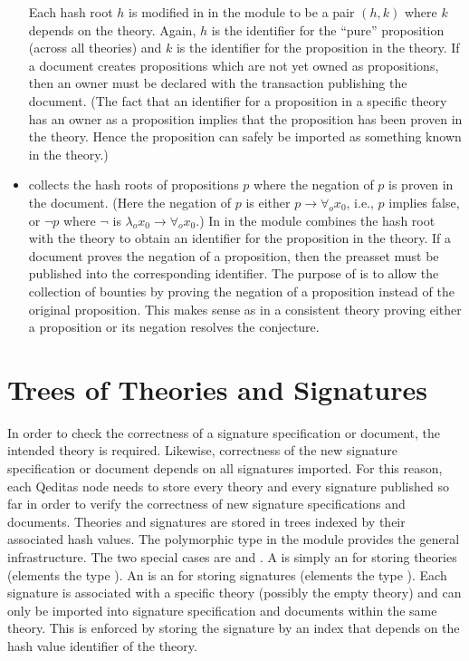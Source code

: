 \begin{itemize}
Each hash root $h$ is modified in {} in the module {}
to be a pair $(h,k)$ where $k$ depends on the theory.
Again, $h$ is the identifier for the ``pure'' proposition (across all theories)
and $k$ is the identifier for the proposition in the theory.
If a document creates propositions which are not yet owned as propositions, then an
owner must be declared with the transaction publishing the document.
(The fact that an identifier for a proposition in a specific theory has an owner as a proposition
implies that the proposition has been proven in the theory. Hence the proposition can safely
be imported as something known in the theory.)
\item {} collects the hash roots of propositions $p$
 where the negation of $p$ is proven in the document.
 (Here the negation of $p$ is either $p\to\forall_o x_0$, i.e., $p$ implies false,
 or $\neg p$ where $\neg$ is $\lambda_o x_0\to\forall_o x_0$.)
 In {} in the module {} combines the hash
 root with the theory to obtain an identifier for the proposition in the theory.
 If a document proves the negation of a proposition, then the {}
 preasset must be published into the corresponding identifier.
 The purpose of {} is to allow the collection of bounties by
 proving the negation of a proposition instead of the original proposition.
 This makes sense as in a consistent theory proving either a proposition or its negation
 resolves the conjecture.
\end{itemize}

\section{Trees of Theories and Signatures}

In order to check the correctness of a signature specification
or document, the intended theory is required.
Likewise, correctness of the new signature specification
or document depends on all signatures imported.
For this reason, each Qeditas node needs to store every theory
and every signature published so far in order to verify the correctness of
new signature specifications and documents.
Theories and signatures are stored in trees indexed by their associated
hash values. The polymorphic type {} in the module {}
provides the general infrastructure.
The two special cases are
{}
and
{}.
A {} is simply an {} for storing theories (elements the type {}).
An {} is an {} for storing signatures (elements the type {}).
Each signature is associated with a specific theory (possibly the empty theory)
and can only be imported into signature specification and documents
within the same theory. This is enforced by storing the signature by an index that
depends on the hash value identifier of the theory.

